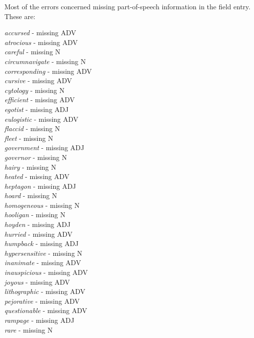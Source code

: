 \medskip

Most of the errors concerned missing part-of-speech information in the
field entry.  These are:

\smallskip

\noindent
{\it accursed}    - missing ADV \\
{\it atrocious}   - missing ADV \\
{\it careful}     - missing N \\
{\it circumnavigate} - missing N \\
{\it corresponding} - missing ADV \\
{\it cursive}     - missing ADV \\
{\it cytology}    - missing N \\
{\it efficient}   - missing ADV \\
{\it egotist}     - missing ADJ \\
{\it eulogistic}  - missing ADV \\
{\it flaccid}     - missing N \\
{\it fleet}       - missing N \\
{\it government}  - missing ADJ \\
{\it governor}    - missing N \\
{\it hairy}       - missing N \\
{\it heated}      - missing ADV \\
{\it heptagon}    - missing ADJ \\
{\it hoard}       - missing N \\
{\it homogeneous} - missing N \\
{\it hooligan}    - missing N \\
{\it hoyden}      - missing ADJ \\
{\it hurried}     - missing ADV \\
{\it humpback}    - missing ADJ \\
{\it hypersensitive} - missing N \\
{\it inanimate}   - missing ADV \\
{\it inauspicious} - missing ADV \\
{\it joyous}      - missing ADV \\
{\it lithographic} - missing ADV \\
{\it pejorative}  - missing ADV \\
{\it questionable} - missing ADV \\
{\it rampage}     - missing ADJ \\
{\it rare}        - missing N \\
